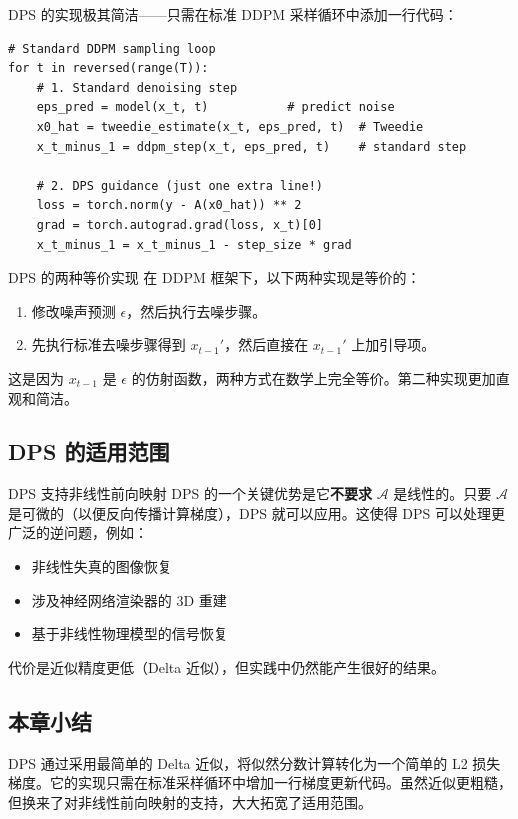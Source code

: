 DPS 的实现极其简洁——只需在标准 DDPM 采样循环中添加一行代码：

\begin{lstlisting}[caption={DPS 引导的伪代码}]
# Standard DDPM sampling loop
for t in reversed(range(T)):
    # 1. Standard denoising step
    eps_pred = model(x_t, t)           # predict noise
    x0_hat = tweedie_estimate(x_t, eps_pred, t)  # Tweedie
    x_t_minus_1 = ddpm_step(x_t, eps_pred, t)    # standard step

    # 2. DPS guidance (just one extra line!)
    loss = torch.norm(y - A(x0_hat)) ** 2
    grad = torch.autograd.grad(loss, x_t)[0]
    x_t_minus_1 = x_t_minus_1 - step_size * grad
\end{lstlisting}

\begin{importantbox}{DPS 的两种等价实现}
在 DDPM 框架下，以下两种实现是等价的：
\begin{enumerate}
    \item 修改噪声预测 $\epsilon$，然后执行去噪步骤。
    \item 先执行标准去噪步骤得到 $x_{t-1}'$，然后直接在 $x_{t-1}'$ 上加引导项。
\end{enumerate}
这是因为 $x_{t-1}$ 是 $\epsilon$ 的仿射函数，两种方式在数学上完全等价。第二种实现更加直观和简洁。
\end{importantbox}

\subsection{DPS 的适用范围}

\begin{knowledgebox}{DPS 支持非线性前向映射}
DPS 的一个关键优势是它\textbf{不要求} $\mathcal{A}$ 是线性的。只要 $\mathcal{A}$ 是可微的（以便反向传播计算梯度），DPS 就可以应用。这使得 DPS 可以处理更广泛的逆问题，例如：
\begin{itemize}
    \item 非线性失真的图像恢复
    \item 涉及神经网络渲染器的 3D 重建
    \item 基于非线性物理模型的信号恢复
\end{itemize}
代价是近似精度更低（Delta 近似），但实践中仍然能产生很好的结果。
\end{knowledgebox}

\subsection{本章小结}

DPS 通过采用最简单的 Delta 近似，将似然分数计算转化为一个简单的 L2 损失梯度。它的实现只需在标准采样循环中增加一行梯度更新代码。虽然近似更粗糙，但换来了对非线性前向映射的支持，大大拓宽了适用范围。


